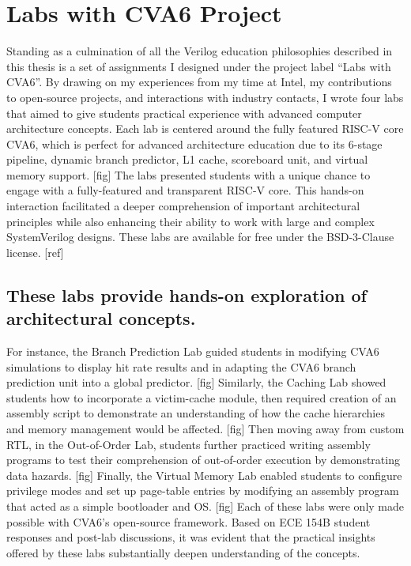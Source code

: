 
\chapter{Labs with CVA6 Project}
\label{chapter:labs_with_cva6}

Standing as a culmination of all the Verilog education philosophies described in this thesis is a set of assignments I designed under the project label ``Labs with CVA6''. By drawing on my experiences from my time at Intel, my contributions to open-source projects, and interactions with industry contacts, I wrote four labs that aimed to give students practical experience with advanced computer architecture concepts. Each lab is centered around the fully featured RISC-V core CVA6, which is perfect for advanced architecture education due to its 6-stage pipeline, dynamic branch predictor, L1 cache, scoreboard unit, and virtual memory support. [fig] The labs presented students with a unique chance to engage with a fully-featured and transparent RISC-V core. This hands-on interaction facilitated a deeper comprehension of important architectural principles while also enhancing their ability to work with large and complex SystemVerilog designs. These labs are available for free under the BSD-3-Clause license. [ref]

\section{These labs provide hands-on exploration of architectural concepts.}

For instance, the Branch Prediction Lab guided students in modifying CVA6 simulations to display hit rate results and in adapting the CVA6 branch prediction unit into a global predictor. [fig] Similarly, the Caching Lab showed students how to incorporate a victim-cache module, then required creation of an assembly script to demonstrate an understanding of how the cache hierarchies and memory management would be affected. [fig] Then moving away from custom RTL, in the Out-of-Order Lab, students further practiced writing assembly programs to test their comprehension of out-of-order execution by demonstrating data hazards. [fig] Finally, the Virtual Memory Lab enabled students to configure privilege modes and set up page-table entries by modifying an assembly program that acted as a simple bootloader and OS. [fig] Each of these labs were only made possible with CVA6's open-source framework. Based on ECE 154B student responses and post-lab discussions, it was evident that the practical insights offered by these labs substantially deepen understanding of the concepts.


